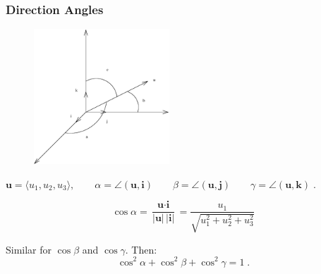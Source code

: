 \begin{frame}
 \frametitle{Direction Angles}

\begin{figure}[h]
  \includegraphics[height=2in]{../images/ok-direction_angles.eps}
\end{figure}


$\textbf{u} = \langle u_1, u_2, u_3\rangle, \qquad \alpha = \angle (\textbf{u},\textbf{i}) \qquad \beta =
\angle (\textbf{u},\textbf{j}) \qquad \gamma = \angle (\textbf{u},\textbf{k}) \; .$

$$\cos{\alpha} = \frac{\textbf{u} \cdot \textbf{i}}{|\textbf{u}|\, |\textbf{i}|} =
\frac{u_1}{\sqrt{u_1^2+u_2^2+u_3^2}}$$

Similar for $\cos{\beta}$ and $\cos{\gamma}$. Then:
%
$$\cos^2\alpha + \cos^2\beta + \cos^2\gamma = 1\; .$$

\end{frame}

